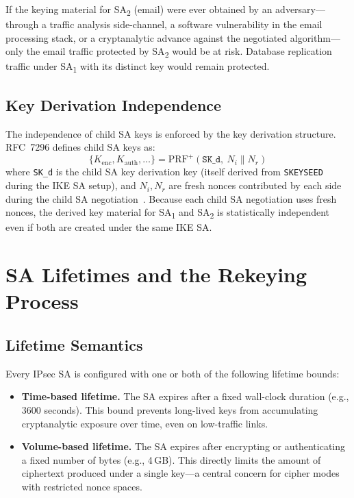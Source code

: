 \documentclass[sigconf,nonacm]{acmart}
\begin{document}
If the keying material for SA\textsubscript{2} (email) were ever obtained by an
adversary---through a traffic analysis side-channel, a software vulnerability in
the email processing stack, or a cryptanalytic advance against the negotiated
algorithm---only the email traffic protected by SA\textsubscript{2} would be at risk.
Database replication traffic under SA\textsubscript{1} with its distinct key would
remain protected.

\subsection{Key Derivation Independence}

The independence of child SA keys is enforced by the key derivation structure.
RFC~7296 defines child SA keys as:
\[
  \{K_{\mathrm{enc}}, K_{\mathrm{auth}}, \ldots\} = \mathrm{PRF}^+(\texttt{SK\_d},\ N_i \mathbin\| N_r)
\]
where \texttt{SK\_d} is the child SA key derivation key (itself derived from
\texttt{SKEYSEED} during the IKE SA setup), and $N_i, N_r$ are fresh nonces
contributed by each side during the child SA negotiation~\cite{rfc7296}. Because
each child SA negotiation uses fresh nonces, the derived key material for
SA\textsubscript{1} and SA\textsubscript{2} is statistically independent even if
both are created under the same IKE SA.

\section{SA Lifetimes and the Rekeying Process}
\label{sec:lifetimes}

\subsection{Lifetime Semantics}

Every IPsec SA is configured with one or both of the following lifetime bounds:

\begin{itemize}
  \item \textbf{Time-based lifetime.} The SA expires after a fixed wall-clock
        duration (e.g., 3600 seconds). This bound prevents long-lived keys from
        accumulating cryptanalytic exposure over time, even on low-traffic links.
  \item \textbf{Volume-based lifetime.} The SA expires after encrypting or
        authenticating a fixed number of bytes (e.g., 4\,GB). This directly limits
        the amount of ciphertext produced under a single key---a central concern
        for cipher modes with restricted nonce spaces.
\end{itemize}
\end{document}

